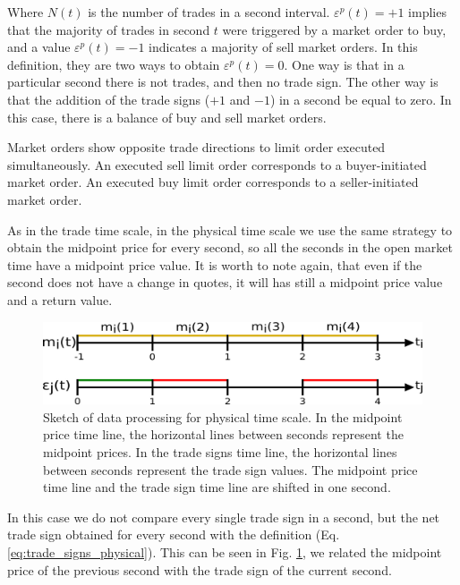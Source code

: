 Where $N \left(t \right)$ is the number of trades in a second interval.
$\varepsilon^{p}\left( t \right) = +1$ implies that the majority of
trades in second $t$ were triggered by a market order to buy, and a value
$\varepsilon^{p}\left( t \right) = -1$ indicates a majority of sell
market orders. In this definition, they are two ways to obtain
$\varepsilon^{p}\left( t \right) = 0$. One way is that in a particular
second there is not trades, and then no trade sign. The other  way is that the
addition of the trade signs ($+1$ and $-1$) in a second be equal to zero. In
this case, there is a balance of buy and sell market orders.

Market orders show opposite trade directions to limit order executed
simultaneously. An executed sell limit order corresponds to a buyer-initiated
market order. An executed buy limit order corresponds to a seller-initiated
market order.

As in the trade time scale, in the physical time scale we use the same strategy
to obtain the midpoint price for every second, so all the seconds in the open
market time have a midpoint price value. It is worth to note again, that even
if the second does not have a change in quotes, it will has still a midpoint
price value and a return value.

\begin{figure}[htbp]
    \centering
    \includegraphics[width=\columnwidth]
    {figures/02_relation_trades_quotes_time_scale.png}
    \caption{Sketch of data processing for physical time scale. In the midpoint
             price time line, the horizontal lines between seconds represent
             the midpoint prices. In the trade signs time line, the horizontal
             lines between seconds represent the trade sign values. The
             midpoint price time line and the trade sign time line are shifted
             in one second.}
    \label{fig:relation_trades_midpoint_time_scale}
\end{figure}

In this case we do not compare every single trade sign in a second, but the net
trade sign obtained for every second with the definition
(Eq. \ref{eq:trade_signs_physical}). This can be seen in
Fig. \ref{fig:relation_trades_midpoint_time_scale}, we related the midpoint
price of the previous second with the trade sign of the current second.


